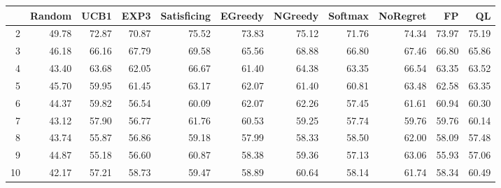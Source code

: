 \begin{table}[ht]
\centering
\begin{tabular}{rrrrrrrrrrr}
  \hline
 & Random & UCB1 & EXP3 & Satisficing & EGreedy & NGreedy & Softmax & NoRegret & FP & QL \\ 
  \hline
2 & 49.78 & 72.87 & 70.87 & 75.52 & 73.83 & 75.12 & 71.76 & 74.34 & 73.97 & 75.19 \\ 
  3 & 46.18 & 66.16 & 67.79 & 69.58 & 65.56 & 68.88 & 66.80 & 67.46 & 66.80 & 65.86 \\ 
  4 & 43.40 & 63.68 & 62.05 & 66.67 & 61.40 & 64.38 & 63.35 & 66.54 & 63.35 & 63.52 \\ 
  5 & 45.70 & 59.95 & 61.45 & 63.17 & 62.07 & 61.40 & 60.81 & 63.48 & 62.58 & 63.35 \\ 
  6 & 44.37 & 59.82 & 56.54 & 60.09 & 62.07 & 62.26 & 57.45 & 61.61 & 60.94 & 60.30 \\ 
  7 & 43.12 & 57.90 & 56.77 & 61.76 & 60.53 & 59.25 & 57.74 & 59.76 & 59.76 & 60.14 \\ 
  8 & 43.74 & 55.87 & 56.86 & 59.18 & 57.99 & 58.33 & 58.50 & 62.00 & 58.09 & 57.48 \\ 
  9 & 44.87 & 55.18 & 56.60 & 60.87 & 58.38 & 59.36 & 57.13 & 63.06 & 55.93 & 57.06 \\ 
  10 & 42.17 & 57.21 & 58.73 & 59.47 & 58.89 & 60.64 & 58.14 & 61.74 & 58.34 & 60.49 \\ 
   \hline
\end{tabular}
\end{table}
